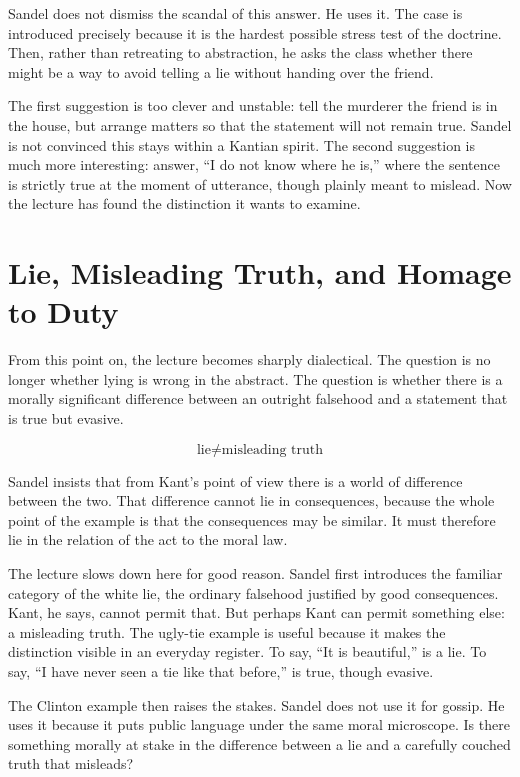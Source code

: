 Sandel does not dismiss the scandal of this answer. He uses it. The case is introduced precisely because it is the hardest possible stress test of the doctrine. Then, rather than retreating to abstraction, he asks the class whether there might be a way to avoid telling a lie without handing over the friend.

The first suggestion is too clever and unstable: tell the murderer the friend is in the house, but arrange matters so that the statement will not remain true. Sandel is not convinced this stays within a Kantian spirit. The second suggestion is much more interesting: answer, ``I do not know where he is,'' where the sentence is strictly true at the moment of utterance, though plainly meant to mislead. Now the lecture has found the distinction it wants to examine.

\section{Lie, Misleading Truth, and Homage to Duty}

From this point on, the lecture becomes sharply dialectical. The question is no longer whether lying is wrong in the abstract. The question is whether there is a morally significant difference between an outright falsehood and a statement that is true but evasive.

\begin{equation}
\text{lie} \neq \text{misleading truth}
\end{equation}

Sandel insists that from Kant's point of view there is a world of difference between the two. That difference cannot lie in consequences, because the whole point of the example is that the consequences may be similar. It must therefore lie in the relation of the act to the moral law.

The lecture slows down here for good reason. Sandel first introduces the familiar category of the white lie, the ordinary falsehood justified by good consequences. Kant, he says, cannot permit that. But perhaps Kant can permit something else: a misleading truth. The ugly-tie example is useful because it makes the distinction visible in an everyday register. To say, ``It is beautiful,'' is a lie. To say, ``I have never seen a tie like that before,'' is true, though evasive.

The Clinton example then raises the stakes. Sandel does not use it for gossip. He uses it because it puts public language under the same moral microscope. Is there something morally at stake in the difference between a lie and a carefully couched truth that misleads?

